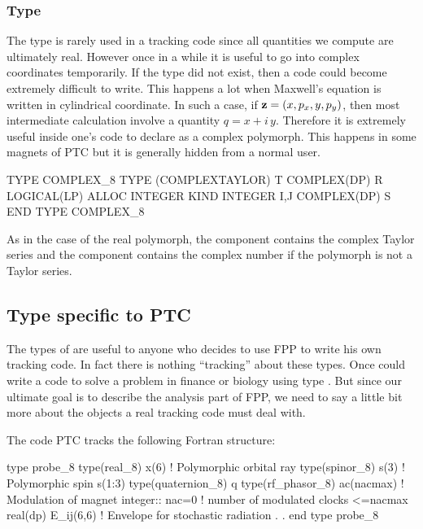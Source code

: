 \documentclass[english,12pt,article]{article} %
\begin{document}
 \subsubsection{Type \protect{}}  \label{sec:complex_8}
 
 The type  \protect{} is rarely used in a tracking code since all quantities we compute are ultimately real. However once in a while it is useful to go into complex coordinates temporarily. If the type  did not exist, then a code could become extremely difficult to write. This happens a lot when Maxwell's equation is written in cylindrical coordinate. In such a case, if ${\bf z}=(x,p_x,y,p_y)$, then most intermediate calculation involve a quantity $q=x+i\,y$. Therefore it is extremely useful inside one's code to declare  as a complex polymorph. This happens in some magnets of PTC but it is generally hidden from a normal user. 
 
 \begin{example2}
TYPE COMPLEX_8
 TYPE (COMPLEXTAYLOR) T 
 COMPLEX(DP) R
 LOGICAL(LP) ALLOC
 INTEGER KIND
 INTEGER I,J 
 COMPLEX(DP) S
END TYPE COMPLEX_8
  \end{example2}
  
 As in the case of the real polymorph, the  component contains the complex Taylor series and the  component contains the complex number if the polymorph is not a Taylor series. 
  
  \subsection{Type   \protect{}  specific to PTC}\label{sec:codetype}

The types of  are useful to anyone who decides to use FPP to write his own tracking code. In fact there is nothing ``tracking'' about these types. Once could write a code to solve a problem in finance or biology using  type . But since our ultimate goal is to describe the analysis part of FPP, we need to say a little bit more about the objects a real tracking code must deal with.

The code PTC tracks the following Fortran structure:
  

  \begin{example}
    type probe_8
     type(real_8) x(6)     ! Polymorphic orbital ray
     type(spinor_8) s(3)   ! Polymorphic spin s(1:3)
     type(quaternion_8) q 
     type(rf_phasor_8)  ac(nacmax)  ! Modulation of magnet
     integer:: nac=0 !  number of modulated clocks <=nacmax
     real(dp) E_ij(6,6)   !  Envelope for stochastic radiation
           .
           .
  end type probe_8
    \end{example}
\end{document}
